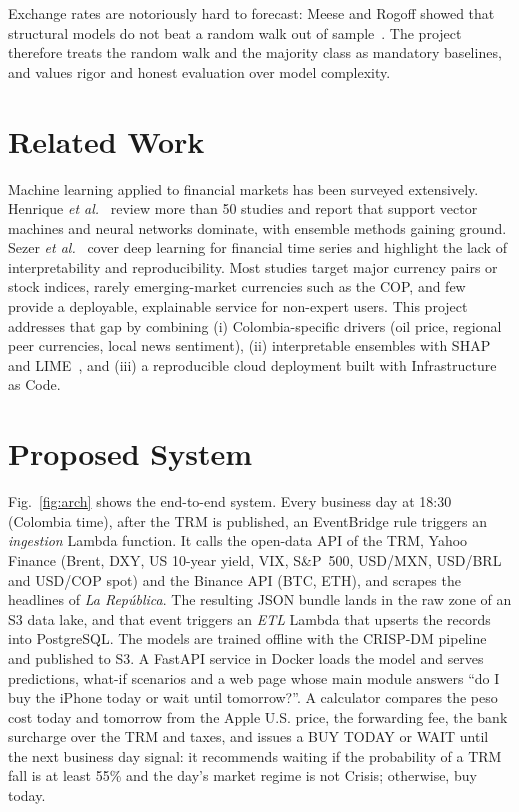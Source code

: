 \documentclass[conference]{IEEEtran}
\begin{document}
Exchange rates are notoriously hard to forecast: Meese and Rogoff showed that structural models do not beat a random walk out of sample~\cite{meese1983}. The project therefore treats the random walk and the majority class as mandatory baselines, and values rigor and honest evaluation over model complexity.

\section{Related Work}
Machine learning applied to financial markets has been surveyed extensively. Henrique \emph{et al.}~\cite{henrique2019} review more than 50 studies and report that support vector machines and neural networks dominate, with ensemble methods gaining ground. Sezer \emph{et al.}~\cite{sezer2020} cover deep learning for financial time series and highlight the lack of interpretability and reproducibility. Most studies target major currency pairs or stock indices, rarely emerging-market currencies such as the COP, and few provide a deployable, explainable service for non-expert users. This project addresses that gap by combining (i) Colombia-specific drivers (oil price, regional peer currencies, local news sentiment), (ii) interpretable ensembles with SHAP~\cite{lundberg2017} and LIME~\cite{ribeiro2016}, and (iii) a reproducible cloud deployment built with Infrastructure as Code.

\section{Proposed System}
Fig.~\ref{fig:arch} shows the end-to-end system. Every business day at 18:30 (Colombia time), after the TRM is published, an EventBridge rule triggers an \emph{ingestion} Lambda function. It calls the open-data API of the TRM, Yahoo Finance (Brent, DXY, US 10-year yield, VIX, S\&P~500, USD/MXN, USD/BRL and USD/COP spot) and the Binance API (BTC, ETH), and scrapes the headlines of \emph{La Rep\'ublica}. The resulting JSON bundle lands in the raw zone of an S3 data lake, and that event triggers an \emph{ETL} Lambda that upserts the records into PostgreSQL. The models are trained offline with the CRISP-DM pipeline and published to S3. A FastAPI service in Docker loads the model and serves predictions, what-if scenarios and a web page whose main module answers ``do I buy the iPhone today or wait until tomorrow?''. A calculator compares the peso cost today and tomorrow from the Apple U.S. price, the forwarding fee, the bank surcharge over the TRM and taxes, and issues a BUY TODAY or WAIT until the next business day signal: it recommends waiting if the probability of a TRM fall is at least 55\% and the day's market regime is not Crisis; otherwise, buy today.
\end{document}
